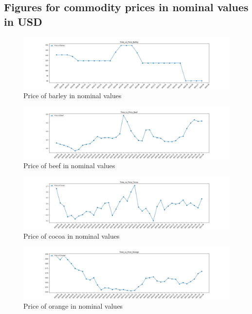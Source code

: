 \documentclass{scrartcl}
\begin{document}
\subsection{Figures for commodity prices in nominal values in USD}
\begin{figure} [H]
	\begin{center}
		\includegraphics[scale=0.3]{Graphics/Time_vs_Price_Barley.png}
	\end{center}
	\caption{Price of barley in nominal values}
	\label{fig:log-archi}
\end{figure}
\begin{figure} [H]
	\begin{center}
		\includegraphics[scale=0.3]{Graphics/Time_vs_Price_Beef.png}
	\end{center}
	\caption{Price of beef in nominal values}
	\label{fig:log-archi}
\end{figure}
\begin{figure} [H]
	\begin{center}
		\includegraphics[scale=0.3]{Graphics/Time_vs_Price_Cocoa.png}
	\end{center}
	\caption{Price of cocoa in nominal values}
	\label{fig:log-archi}
\end{figure}
\begin{figure} [H]
	\begin{center}
		\includegraphics[scale=0.3]{Graphics/Time_vs_Price_Orange.png}
	\end{center}
	\caption{Price of orange in nominal values}
	\label{fig:log-archi}
\end{figure}
\end{document}
